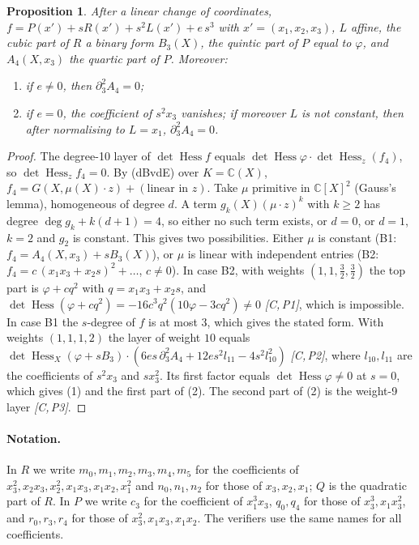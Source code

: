 \documentclass[11pt]{article}
\newtheorem{proposition}[theorem]{Proposition}
\theoremstyle{remark}
\newcommand{\C}{\mathbb{C}}
\newcommand{\Hess}{\operatorname{Hess}}
\newcommand{\cert}[1]{\emph{[C,\,#1]}}
\begin{document}
\begin{proposition}\label{prop:B}
After a linear change of coordinates, $f=P(x')+sR(x')+s^2L(x')+e\,s^3$ with $x'=(x_1,x_2,x_3)$, $L$ affine, the cubic part of $R$ a binary form $B_3(X)$, the quintic part of $P$ equal to $\varphi$, and $A_4(X,x_3)$ the quartic part of $P$. Moreover:
\begin{enumerate}
\item if $e\ne0$, then $\partial_3^2A_4=0$;
\item if $e=0$, the coefficient of $s^2x_3$ vanishes; if moreover $L$ is not constant, then after normalising to $L=x_1$, $\partial_3^2A_4=0$.
\end{enumerate}
\end{proposition}
\begin{proof}
The degree-10 layer of $\det\Hess f$ equals $\det\Hess\varphi\cdot\det\Hess_z(f_4)$, so $\det\Hess_zf_4=0$. By (dBvdE) over $K=\C(X)$, $f_4=G(X,\mu(X)\cdot z)+(\text{linear in }z)$. Take $\mu$ primitive in $\C[X]^2$ (Gauss's lemma), homogeneous of degree $d$. A term $g_k(X)(\mu\cdot z)^k$ with $k\ge2$ has degree $\deg g_k+k(d+1)=4$, so either no such term exists, or $d=0$, or $d=1$, $k=2$ and $g_2$ is constant. This gives two possibilities. Either $\mu$ is constant (B1: $f_4=A_4(X,x_3)+sB_3(X)$), or $\mu$ is linear with independent entries (B2: $f_4=c\,(x_1x_3+x_2s)^2+\dots$, $c\ne0$). In case B2, with weights $(1,1,\tfrac32,\tfrac32)$ the top part is $\varphi+cq^2$ with $q=x_1x_3+x_2s$, and $\det\Hess(\varphi+cq^2)=-16c^3q^2(10\varphi-3cq^2)\ne0$ \cert{P1}, which is impossible. In case B1 the $s$-degree of $f$ is at most $3$, which gives the stated form. With weights $(1,1,1,2)$ the layer of weight $10$ equals $\det\Hess_X(\varphi+sB_3)\cdot(6es\,\partial_3^2A_4+12es^2l_{11}-4s^2l_{10}^2)$ \cert{P2}, where $l_{10},l_{11}$ are the coefficients of $s^2x_3$ and $sx_3^2$. Its first factor equals $\det\Hess\varphi\ne0$ at $s=0$, which gives (1) and the first part of (2). The second part of (2) is the weight-9 layer \cert{P3}.
\end{proof}

\paragraph{Notation.} In $R$ we write $m_0,m_1,m_2,m_3,m_4,m_5$ for the coefficients of $x_3^2,x_2x_3,x_2^2,x_1x_3,x_1x_2,x_1^2$ and $n_0,n_1,n_2$ for those of $x_3,x_2,x_1$; $Q$ is the quadratic part of $R$. In $P$ we write $c_3$ for the coefficient of $x_1^3x_3$, $q_0,q_4$ for those of $x_3^3,x_1x_3^2$, and $r_0,r_3,r_4$ for those of $x_3^2,x_1x_3,x_1x_2$. The verifiers use the same names for all coefficients.
\end{document}
